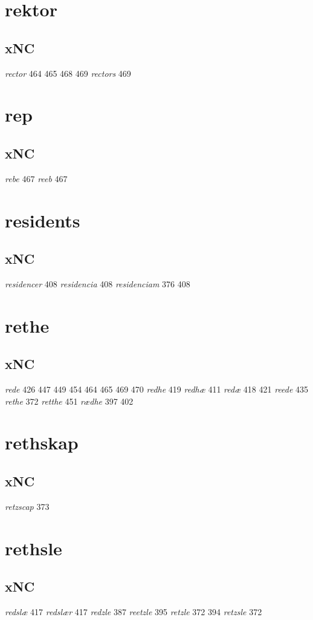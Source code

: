 \documentclass[a4paper,twocolumn]{article}
\begin{document}
\section{rektor}
\label{sec:orgf12cbb5}
\subsection{xNC}
\label{sec:org22ad5ed}
\emph{rector} 464 465 468 469 \emph{rectors} 469 
\section{rep}
\label{sec:org90f589d}
\subsection{xNC}
\label{sec:org1b430cc}
\emph{rebe} 467 \emph{reeb} 467 
\section{residents}
\label{sec:org528ac4b}
\subsection{xNC}
\label{sec:orgbbd26fb}
\emph{residencer} 408 \emph{residencia} 408 \emph{residenciam} 376 408 
\section{rethe}
\label{sec:org561bd9e}
\subsection{xNC}
\label{sec:org06f1713}
\emph{rede} 426 447 449 454 464 465 469 470 \emph{redhe} 419 \emph{redhæ} 411 \emph{redæ} 418 421 \emph{reede} 435 \emph{rethe} 372 \emph{retthe} 451 \emph{rædhe} 397 402 
\section{rethskap}
\label{sec:org13f0c8c}
\subsection{xNC}
\label{sec:org4a44ed5}
\emph{retzscap} 373 
\section{rethsle}
\label{sec:org89ad875}
\subsection{xNC}
\label{sec:orgda28257}
\emph{redslæ} 417 \emph{redslær} 417 \emph{redzle} 387 \emph{reetzle} 395 \emph{retzle} 372 394 \emph{retzsle} 372 
\end{document}

